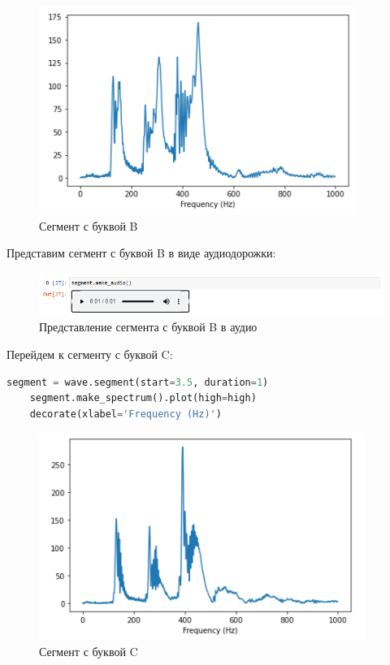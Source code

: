 \documentclass[a4paper]{article}
\begin{document}
             \begin{figure}[H]
                \centering
                \includegraphics{ex_6_letter_b_segment.png}
                \caption{Сегмент с буквой B}
                \label{fig:ex_6_letter_b_segment}
            \end{figure}
            
            Представим сегмент с буквой B в виде аудиодорожки:
            
            \begin{figure}[H]
                \centering
                \includegraphics[width=\textwidth]{ex_6_letter_b_audio.png}
                \caption{Представление сегмента с буквой B в аудио}
                \label{fig:ex_6_letter_b_audio}
            \end{figure}
            
             Перейдем к сегменту с буквой C:
            
\begin{lstlisting}[language=Python, caption= Сегмент с буквой C]
    segment = wave.segment(start=3.5, duration=1)
    segment.make_spectrum().plot(high=high)
    decorate(xlabel='Frequency (Hz)')
\end{lstlisting}   
            
             \begin{figure}[H]
                \centering
                \includegraphics{ex_6_letter_c_segment.png}
                \caption{Сегмент с буквой C}
                \label{fig:ex_6_letter_c_segment}
            \end{figure}
            
\end{document}
